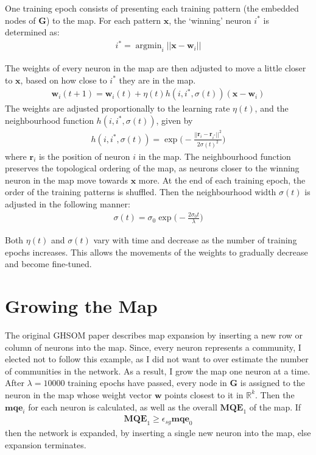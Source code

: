 \documentclass{report}
\DeclareMathOperator*{\argmin}{argmin}
\begin{document}
	One training epoch consists of presenting each training pattern (the embedded nodes of $\textbf{G}$) to the map. 
	For each pattern $\textbf{x}$, the `winning' neuron $i^*$ is determined as:
	\begin{align}
	i^* = \argmin_i  ||\textbf{x} - \textbf{w}_i||
	\end{align}
	
	The weights of every neuron in the map are then adjusted to move a little closer to $\textbf{x}$, based on how close to $i^*$ they are in the map.
	\begin{align}
	\textbf{w}_i(t+1) = \textbf{w}_i(t) + \eta(t) h(i, i^*, \sigma(t)) (\textbf{x} - \textbf{w}_i)
	\end{align}
	The weights are adjusted proportionally to the learning rate $\eta(t)$, and the neighbourhood function $h(i, i^*, \sigma(t))$, given by
	\begin{align}
	h(i, i^*, \sigma(t)) = \exp\Bigg(-\frac{||\textbf{r}_i-\textbf{r}_{i^*}||^2}{2\sigma(t)^2}\Bigg)
	\end{align}
	where $\textbf{r}_i$ is the position of neuron $i$ in the map.
	The neighbourhood function preserves the topological ordering of the map, as neurons closer to the winning neuron in the map move towards $\textbf{x}$ more.
	At the end of each training epoch, the order of the training patterns is shuffled. Then the neighbourhood width $\sigma(t)$ is adjusted in the following manner:
	\begin{align}
	\sigma(t) = \sigma_0 \exp \Bigg(-\frac{2 \sigma_0 t}{\lambda}\Bigg)
	\end{align}
	
	Both $\eta(t)$ and $\sigma(t)$ vary with time and decrease as the number of training epochs increases. 
	This allows the movements of the weights to gradually decrease and become fine-tuned.
	
	
	
	\section{Growing the Map}
	The original GHSOM paper describes map expansion by inserting a new row or column of neurons into the map. 
	Since, every neuron represents a community, I elected not to follow this example, as I did not want to over estimate the number of communities in the network. 
	As a result, I grow the map one neuron at a time.
	After $\lambda=10000$ training epochs have passed, every node in $\textbf{G}$ is assigned to the neuron in the map whose weight vector $\textbf{w}$ points closest to it in $\mathbb{R}^k$. 
	Then the $\textbf{mqe}_i$ for each neuron is calculated, as well as the overall $\textbf{MQE}_1$ of the map. 
	If 
	\begin{align}
	\textbf{MQE}_1 \geq \epsilon_{sg} \textbf{mqe}_0
	\end{align}
	then the network is expanded, by inserting a single new neuron into the map, else expansion terminates.
	
\end{document}
